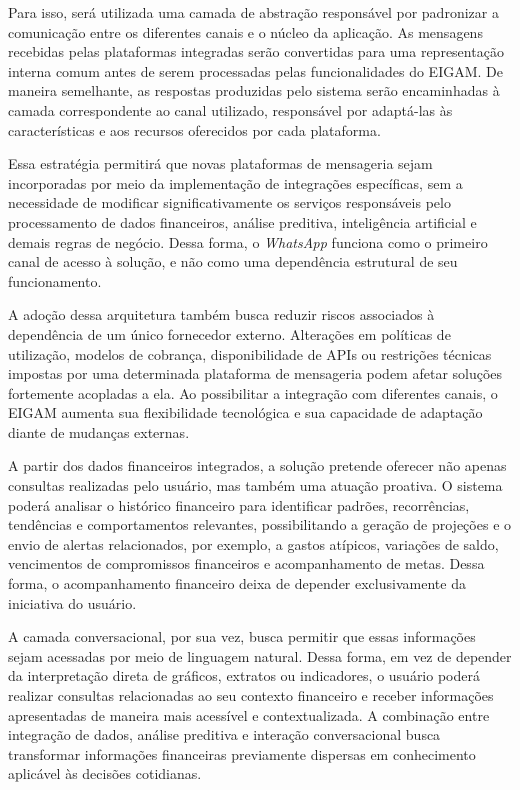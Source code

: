 Para isso, será utilizada uma camada de abstração responsável por padronizar a comunicação entre os diferentes canais e o núcleo da aplicação. As mensagens recebidas pelas plataformas integradas serão convertidas para uma representação interna comum antes de serem processadas pelas funcionalidades do EIGAM. De maneira semelhante, as respostas produzidas pelo sistema serão encaminhadas à camada correspondente ao canal utilizado, responsável por adaptá-las às características e aos recursos oferecidos por cada plataforma.

Essa estratégia permitirá que novas plataformas de mensageria sejam incorporadas por meio da implementação de integrações específicas, sem a necessidade de modificar significativamente os serviços responsáveis pelo processamento de dados financeiros, análise preditiva, inteligência artificial e demais regras de negócio. Dessa forma, o \textit{WhatsApp} funciona como o primeiro canal de acesso à solução, e não como uma dependência estrutural de seu funcionamento.

A adoção dessa arquitetura também busca reduzir riscos associados à dependência de um único fornecedor externo. Alterações em políticas de utilização, modelos de cobrança, disponibilidade de APIs ou restrições técnicas impostas por uma determinada plataforma de mensageria podem afetar soluções fortemente acopladas a ela. Ao possibilitar a integração com diferentes canais, o EIGAM aumenta sua flexibilidade tecnológica e sua capacidade de adaptação diante de mudanças externas.

A partir dos dados financeiros integrados, a solução pretende oferecer não apenas consultas realizadas pelo usuário, mas também uma atuação proativa. O sistema poderá analisar o histórico financeiro para identificar padrões, recorrências, tendências e comportamentos relevantes, possibilitando a geração de projeções e o envio de alertas relacionados, por exemplo, a gastos atípicos, variações de saldo, vencimentos de compromissos financeiros e acompanhamento de metas. Dessa forma, o acompanhamento financeiro deixa de depender exclusivamente da iniciativa do usuário.

A camada conversacional, por sua vez, busca permitir que essas informações sejam acessadas por meio de linguagem natural. Dessa forma, em vez de depender da interpretação direta de gráficos, extratos ou indicadores, o usuário poderá realizar consultas relacionadas ao seu contexto financeiro e receber informações apresentadas de maneira mais acessível e contextualizada. A combinação entre integração de dados, análise preditiva e interação conversacional busca transformar informações financeiras previamente dispersas em conhecimento aplicável às decisões cotidianas.


